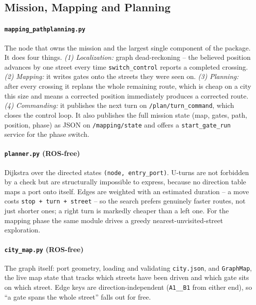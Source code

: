 \documentclass[10pt,a4paper]{article}
\begin{document}
\subsection{Mission, Mapping and Planning}

\paragraph{\texttt{mapping\_pathplanning.py}} The node that owns the mission and
the largest single component of the package. It does four things. \emph{(1)
Localization:} graph dead-reckoning -- the believed position advances by one
street every time \texttt{switch\_control} reports a completed crossing.
\emph{(2) Mapping:} it writes gates onto the streets they were seen on. \emph{(3)
Planning:} after every crossing it replans the whole remaining route, which is
cheap on a city this size and means a corrected position immediately produces a
corrected route. \emph{(4) Commanding:} it publishes the next turn on
\texttt{/plan/turn\_command}, which closes the control loop. It also publishes
the full mission state (map, gates, path, position, phase) as JSON on
\texttt{/mapping/state} and offers a \texttt{start\_gate\_run} service for the
phase switch.

\paragraph{\texttt{planner.py} (ROS-free)} Dijkstra over the directed states
\texttt{(node, entry\_port)}. U-turns are not forbidden by a check but are
structurally impossible to express, because no direction table maps a port onto
itself. Edges are weighted with an estimated duration -- a move costs
\texttt{stop + turn + street} -- so the search prefers genuinely faster routes,
not just shorter ones; a right turn is markedly cheaper than a left one. For the
mapping phase the same module drives a greedy nearest-unvisited-street
exploration.

\paragraph{\texttt{city\_map.py} (ROS-free)} The graph itself: port geometry,
loading and validating \texttt{city.json}, and \texttt{GraphMap}, the live map
state that tracks which streets have been driven and which gate sits on which
street. Edge keys are direction-independent (\texttt{A1\_\_B1} from either end),
so ``a gate spans the whole street'' falls out for free.
\end{document}
